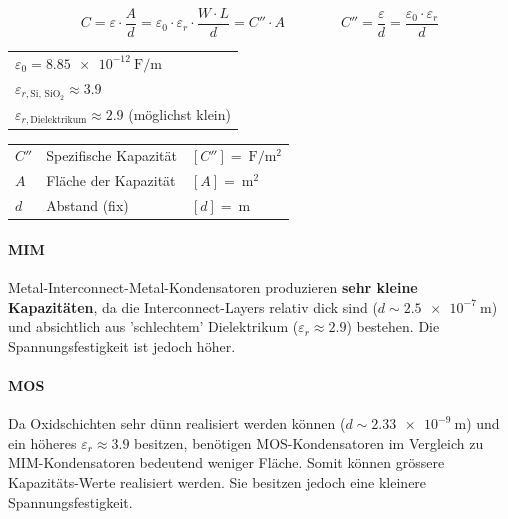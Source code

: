 \[ 
    \boxed{ C = \varepsilon \cdot  \frac{A}{d} = \varepsilon_0 \cdot \varepsilon_r \cdot \frac{W \cdot L}{d} =  C'' \cdot A } \qquad \qquad
    \boxed{ C'' = \frac{\varepsilon}{d} = \frac{\varepsilon_0 \cdot \varepsilon_r}{d} }
\]

\begin{minipage}[t]{0.44\columnwidth}
    \begin{tabular}{l@{}}
        $\varepsilon_0 = \qty{8.85e-12}{\farad\per\meter}$                      \\
        $\varepsilon_{r, \text{Si, SiO$_2$}} \approx 3.9$                       \\
        $\varepsilon_{r, \text{Dielektrikum}} \approx 2.9$ (möglichst klein)   
    \end{tabular}   
\end{minipage}
\hfill
\begin{minipage}[t]{0.55\columnwidth}
    \begin{tabular}{lll@{}}
        $C''$   & Spezifische Kapazität & $[C''] = \qty{}{\farad\per\square\meter}$ \\
        $A$     & Fläche der Kapazität  & $[A] = \qty{}{\square\meter}$             \\
        $d$     & Abstand (fix)         & $[d] = \qty{}{\meter}$
    \end{tabular}
\end{minipage}



\paragraph{MIM}
Metal-Interconnect-Metal-Kondensatoren produzieren \textbf{sehr kleine Kapazitäten}, da die Interconnect-Layers relativ dick sind ($d \sim \qty{2.5e-7}{\meter}$) und absichtlich aus 'schlechtem' Dielektrikum ($\varepsilon_r \approx 2.9$) bestehen.
Die Spannungsfestigkeit ist jedoch höher.

\paragraph{MOS}
Da Oxidschichten sehr dünn realisiert werden können ($d \sim \qty{2.33e-9}{\meter}$) und ein höheres $\varepsilon_r \approx 3.9$ besitzen, benötigen MOS-Kondensatoren im Vergleich zu MIM-Kondensatoren bedeutend weniger Fläche.
Somit können grössere Kapazitäts-Werte realisiert werden.
Sie besitzen jedoch eine kleinere Spannungsfestigkeit.


